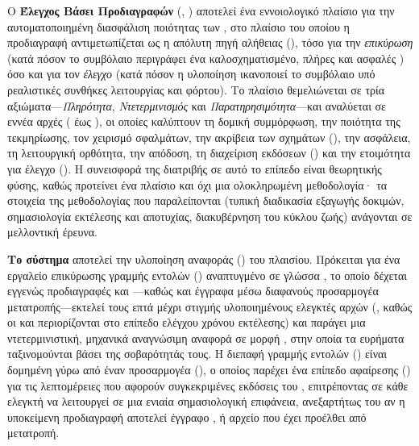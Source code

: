 Ο \textbf{Έλεγχος Βάσει Προδιαγραφών} (, ) αποτελεί ένα εννοιολογικό πλαίσιο για την αυτοματοποιημένη διασφάλιση ποιότητας των , στο πλαίσιο του οποίου η προδιαγραφή αντιμετωπίζεται ως η απόλυτη πηγή αλήθειας (), τόσο για την \emph{επικύρωση} (κατά πόσον το συμβόλαιο περιγράφει ένα καλοσχηματισμένο, πλήρες και ασφαλές ) όσο και για τον \emph{έλεγχο} (κατά πόσον η υλοποίηση ικανοποιεί το συμβόλαιο υπό ρεαλιστικές συνθήκες λειτουργίας και φόρτου). Το πλαίσιο θεμελιώνεται σε τρία αξιώματα---\emph{Πληρότητα}, \emph{Ντετερμινισμός} και \emph{Παρατηρησιμότητα}---και αναλύεται σε εννέα αρχές ( έως ), οι οποίες καλύπτουν τη δομική συμμόρφωση, την ποιότητα της τεκμηρίωσης, τον χειρισμό σφαλμάτων, την ακρίβεια των σχημάτων (), την ασφάλεια, τη λειτουργική ορθότητα, την απόδοση, τη διαχείριση εκδόσεων () και την ετοιμότητα για έλεγχο (). Η συνεισφορά της διατριβής σε αυτό το επίπεδο είναι θεωρητικής φύσης, καθώς προτείνει ένα πλαίσιο και όχι μια ολοκληρωμένη μεθοδολογία· τα στοιχεία της μεθοδολογίας που παραλείπονται (τυπική διαδικασία εξαγωγής δοκιμών, σημασιολογία εκτέλεσης και αποτυχίας, διακυβέρνηση του κύκλου ζωής) ανάγονται σε μελλοντική έρευνα.

\textbf{Το σύστημα } αποτελεί την υλοποίηση αναφοράς () του πλαισίου. Πρόκειται για ένα εργαλείο επικύρωσης γραμμής εντολών () αναπτυγμένο σε γλώσσα , το οποίο δέχεται εγγενώς προδιαγραφές  και ---καθώς και έγγραφα  μέσω διαφανούς προσαρμογέα μετατροπής---εκτελεί τους επτά μέχρι στιγμής υλοποιημένους ελεγκτές αρχών (, καθώς οι  και  περιορίζονται στο επίπεδο ελέγχου χρόνου εκτέλεσης) και παράγει μια ντετερμινιστική, μηχανικά αναγνώσιμη αναφορά σε μορφή , στην οποία τα ευρήματα ταξινομούνται βάσει της σοβαρότητάς τους. Η διεπαφή γραμμής εντολών () είναι δομημένη γύρω από έναν προσαρμογέα  (), ο οποίος παρέχει ένα επίπεδο αφαίρεσης () για τις λεπτομέρειες που αφορούν συγκεκριμένες εκδόσεις του , επιτρέποντας σε κάθε ελεγκτή να λειτουργεί σε μια ενιαία σημασιολογική επιφάνεια, ανεξαρτήτως του αν η υποκείμενη προδιαγραφή αποτελεί έγγραφο ,  ή αρχείο  που έχει προέλθει από μετατροπή.

